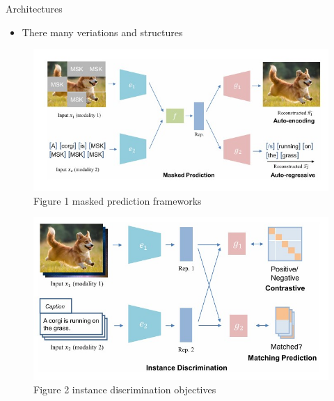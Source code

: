 \documentclass[serif, aspectratio=169]{beamer}
\begin{document}
\begin{frame}{Architectures}
  \begin{itemize}
\item There many veriations and structures
  \end{itemize}
 \begin{minipage}{0.48\textwidth} %
        \begin{figure}
	\centering
        \includegraphics[width=\textwidth]{pic/SSL-MM-var1.jpg} %
        \caption{Figure 1 masked prediction frameworks} %
   \end{figure}
    \end{minipage} \hfill %
    \begin{minipage}{0.48\textwidth}
   \begin{figure}
        \centering
        \includegraphics[width=\textwidth]{pic/SSL-MM-var2.jpg} %
        \caption{Figure 2 instance discrimination objectives} %
   \end{figure}
    \end{minipage}
\end{frame}
\end{document}
